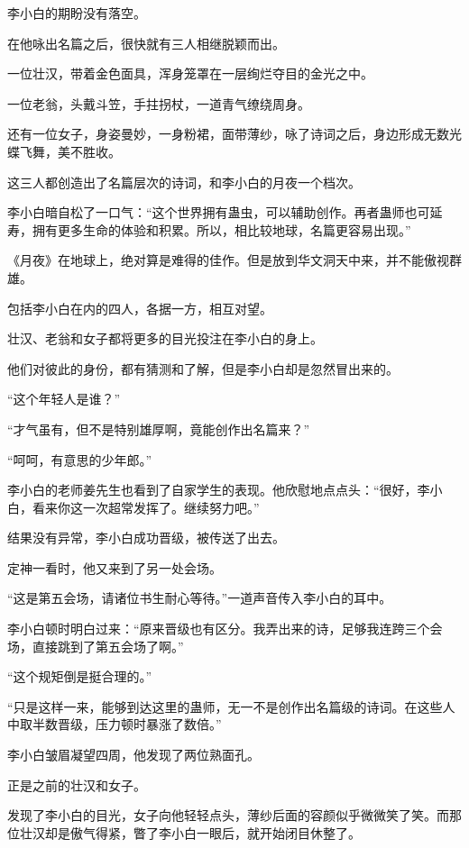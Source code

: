 
\begin{this_body}



李小白的期盼没有落空。

在他咏出名篇之后，很快就有三人相继脱颖而出。

一位壮汉，带着金色面具，浑身笼罩在一层绚烂夺目的金光之中。

一位老翁，头戴斗笠，手拄拐杖，一道青气缭绕周身。

还有一位女子，身姿曼妙，一身粉裙，面带薄纱，咏了诗词之后，身边形成无数光蝶飞舞，美不胜收。

这三人都创造出了名篇层次的诗词，和李小白的月夜一个档次。

李小白暗自松了一口气：“这个世界拥有蛊虫，可以辅助创作。再者蛊师也可延寿，拥有更多生命的体验和积累。所以，相比较地球，名篇更容易出现。”

《月夜》在地球上，绝对算是难得的佳作。但是放到华文洞天中来，并不能傲视群雄。

包括李小白在内的四人，各据一方，相互对望。

壮汉、老翁和女子都将更多的目光投注在李小白的身上。

他们对彼此的身份，都有猜测和了解，但是李小白却是忽然冒出来的。

“这个年轻人是谁？”

“才气虽有，但不是特别雄厚啊，竟能创作出名篇来？”

“呵呵，有意思的少年郎。”

李小白的老师姜先生也看到了自家学生的表现。他欣慰地点点头：“很好，李小白，看来你这一次超常发挥了。继续努力吧。”

结果没有异常，李小白成功晋级，被传送了出去。

定神一看时，他又来到了另一处会场。

“这是第五会场，请诸位书生耐心等待。”一道声音传入李小白的耳中。

李小白顿时明白过来：“原来晋级也有区分。我弄出来的诗，足够我连跨三个会场，直接跳到了第五会场了啊。”

“这个规矩倒是挺合理的。”

“只是这样一来，能够到达这里的蛊师，无一不是创作出名篇级的诗词。在这些人中取半数晋级，压力顿时暴涨了数倍。”

李小白皱眉凝望四周，他发现了两位熟面孔。

正是之前的壮汉和女子。

发现了李小白的目光，女子向他轻轻点头，薄纱后面的容颜似乎微微笑了笑。而那位壮汉却是傲气得紧，瞥了李小白一眼后，就开始闭目休整了。


\end{this_body}
